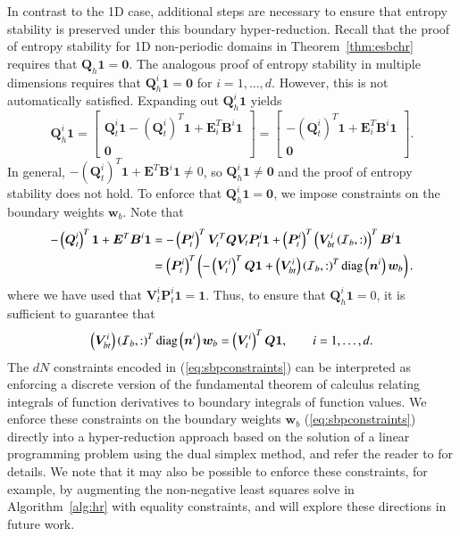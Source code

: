 \documentclass[preprint,10pt]{elsarticle}
\theoremstyle{definition}
\theoremstyle{lemma}
\theoremstyle{theorem}
\theoremstyle{assumption}
\newcommand{\LRp}[1]{\left( #1 \right)}
\begin{document}
In contrast to the 1D case, additional steps are necessary to ensure that entropy stability is preserved under this boundary hyper-reduction.  Recall that the proof of entropy stability for 1D non-periodic domains in Theorem~\ref{thm:esbchr} requires that $\bm{Q}_h\bm{1} = \bm{0}$.  The analogous proof of entropy stability in multiple dimensions requires that $\bm{Q}^i_h\bm{1} = \bm{0}$ for $i = 1,\ldots, d$.  However, this is not automatically satisfied.  Expanding out $\bm{Q}^i_h\bm{1}$ yields
\[
\bm{Q}^i_h\bm{1} = \begin{bmatrix}
\bm{Q}^i_t\bm{1} - \LRp{\bm{Q}^i_t}^T\bm{1} + \bm{E}_i^T\bm{B}^i \bm{1}\\
\bm{0}
\end{bmatrix}= \begin{bmatrix}
-\LRp{\bm{Q}^i_t}^T\bm{1} + \bm{E}_i^T\bm{B}^i \bm{1}\\
\bm{0}
\end{bmatrix}.
\]
In general, $-\LRp{\bm{Q}^i_t}^T\bm{1} + \bm{E}^T\bm{B}^i \bm{1}\neq 0$, so $\bm{Q}^i_h\bm{1} \neq \bm{0}$ and the proof of entropy stability does not hold.  To enforce that $\bm{Q}^i_h\bm{1} = \bm{0}$, we impose constraints on the boundary weights $\bm{w}_b$.  Note that 
\begin{align*}
-\LRp{\bm{Q}^i_t}^T\bm{1} + \bm{E}^T\bm{B}^i \bm{1} &= -\LRp{\bm{P}^i_t}^T\bm{V}_t^T\bm{Q}\bm{V}_t\bm{P}^i_t\bm{1} + \LRp{\bm{P}^i_t}^T\LRp{\bm{V}^i_{bt}\LRp{\mathcal{I}_b,:}}^T\bm{B}^i\bm{1}\\
&= \LRp{\bm{P}^i_t}^T\LRp{-\LRp{\bm{V}^i_t}^T\bm{Q}\bm{1} + \LRp{\bm{V}^i_{bt}}\LRp{\mathcal{I}_b,:}^T{\rm diag}\LRp{\bm{n}^i}\bm{w}_b}.
\end{align*}
where we have used that $\bm{V}^i_t\bm{P}^i_t\bm{1} = \bm{1}$.  Thus, to ensure that $\bm{Q}^i_h\bm{1} = 0$, it is sufficient to guarantee that
\begin{equation}
\LRp{\bm{V}^i_{bt}}\LRp{\mathcal{I}_b,:}^T{\rm diag}\LRp{\bm{n}^i}\bm{w}_b = \LRp{\bm{V}^i_t}^T\bm{Q}\bm{1}, \qquad i = 1,\ldots, d.
\label{eq:sbpconstraints}
\end{equation}
The $dN$ constraints encoded in (\ref{eq:sbpconstraints}) can be interpreted as enforcing a discrete version of the fundamental theorem of calculus relating integrals of function derivatives to boundary integrals of function values.  We enforce these constraints on the boundary weights $\bm{w}_b$ (\ref{eq:sbpconstraints}) directly into a hyper-reduction approach based on the solution of a linear programming problem using the dual simplex method, and refer the reader to \cite{yano2019lp} for details.  We note that it may also be possible to enforce these constraints, for example, by augmenting the non-negative least squares solve in Algorithm~\ref{alg:hr} with equality constraints, and will explore these directions in future work.  
\end{document}
